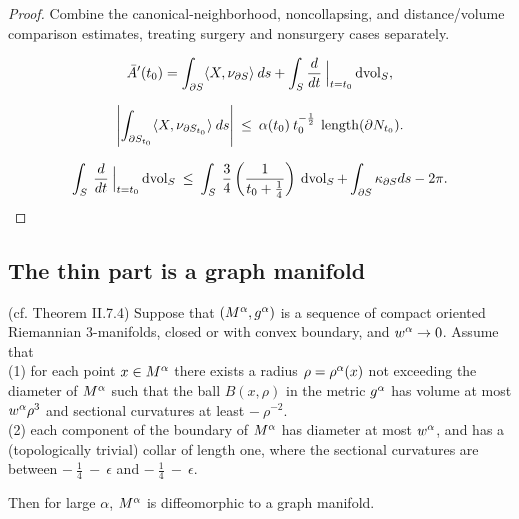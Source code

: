 \begin{proof}
\sketch Combine the canonical-neighborhood, noncollapsing, and distance/volume comparison estimates, treating surgery and nonsurgery cases separately.

\begin{equation}
\label{eqninitial}
\bar A'(t_0)=\int_{\partial S}\langle X,\nu_{\partial S}\rangle\:ds
+\int_S\frac{d}{dt} \: \Big|_{t=t_0} \operatorname{dvol}_S,
\end{equation}

\begin{equation}
\label{eqnbdyterm}
\left|\int_{\partial S_{t_0}}\langle X,\nu_{\partial S_{t_0}}\rangle\:ds\right| \:
\leq \: \alpha(t_0) \: t_0^{-\frac12} \: \operatorname{length}(\partial N_{t_0}).
\end{equation}

\begin{equation} \label{evolve}
\int_S\:\frac{d}{dt} \: \Big|_{t=t_0} \operatorname{dvol}_S \: \le \:
\int_S\:\frac34\left(\frac{1}{t_0+\frac14}\right) \: \operatorname{dvol}_S+\int_{\partial S}\kappa_{\partial S}ds-2\pi.
\end{equation}
\end{proof}

\subsection{The thin part is a graph manifold}
 \label{II.7.4}

\begin{theorem}
  \label{thm:kl-thin-part-graph-manifold-existence-thick-thin-geometry}
 (cf. Theorem II.7.4) \label{thmII.7.4}
Suppose that $(M^\alpha, g^\alpha)$ is a sequence of compact oriented Riemannian
$3$-manifolds, closed or with convex boundary, and $w^\alpha \rightarrow 0$.
Assume that \\
(1) for each point $x \in M^\alpha$ there exists a radius $\rho = \rho^\alpha(x)$
not exceeding the diameter of $M^\alpha$
such that
the ball $B(x, \rho)$ in the metric $g^\alpha$ has volume at most
$w^\alpha \rho^3$ and sectional curvatures at least $- \: \rho^{-2}$.\\
(2) each component of the boundary of $M^\alpha$ has diameter at most
$w^\alpha$, and has a (topologically trivial) collar of length one, where
the sectional curvatures are between $- \: \frac14 \: - \: \epsilon$ and
$- \: \frac14 \: - \: \epsilon$.

Then for large $\alpha$, $M^\alpha$ is diffeomorphic to a graph manifold.
\end{theorem}

